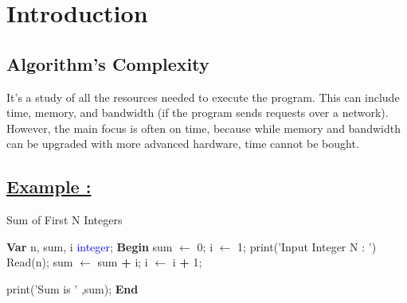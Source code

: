 

\section{Introduction}
\subsection{Algorithm's Complexity}
\vspace{0.25cm}
\begin{tcolorbox}[enhanced, colback=white!90!greenPlot, colframe=greenPlot!60!black, coltitle=white, fonttitle=\bfseries\Large, title=Definition, boxrule=1mm, arc=0.5mm, drop shadow=greenPlot!35!gray]
It's a study of all the resources needed to execute the program. This can include time, memory, and bandwidth
(if the program sends requests over a network). However, the main focus is often on time, because while memory and
bandwidth can be upgraded with more advanced hardware, time cannot be bought.\end{tcolorbox}

\vspace{0.25cm}
\subsection*{\underline{Example :}}

\begin{algorithm}
\caption{Sum of First N Integers}
\begin{algorithmic}[1]
\State \textbf{\textcolor{redPlot}{Var}}
\State n, sum, i \textcolor{blue}{integer};
\vspace{0.5em}
\State  \textbf{\textcolor{redPlot}{Begin}}
\State sum $\gets$ 0; 
\State  i $\gets$ 1;
\vspace{0.5em}
\State \textcolor{purplePlot!80!black}{print}(\textcolor{blueArea!60!black}{'Input Integer N : '}) 
\State \textcolor{purplePlot!80!black}{Read}(n);
\vspace{0.5em}
\State sum $\gets$ sum \textcolor{redPlot}{ \textbf{+}} i; 
\State i $\gets$ i \textcolor{redPlot}{ \textbf{+}} 1; 
\EndWhile

\vspace{0.5em}
\State \textcolor{purplePlot!80!black}{print}(\textcolor{blueArea!60!black}{'Sum is ' },{sum});
\vspace{0.5em}
\State  \textbf{\textcolor{redPlot}{End}}
\end{algorithmic}
\end{algorithm}


